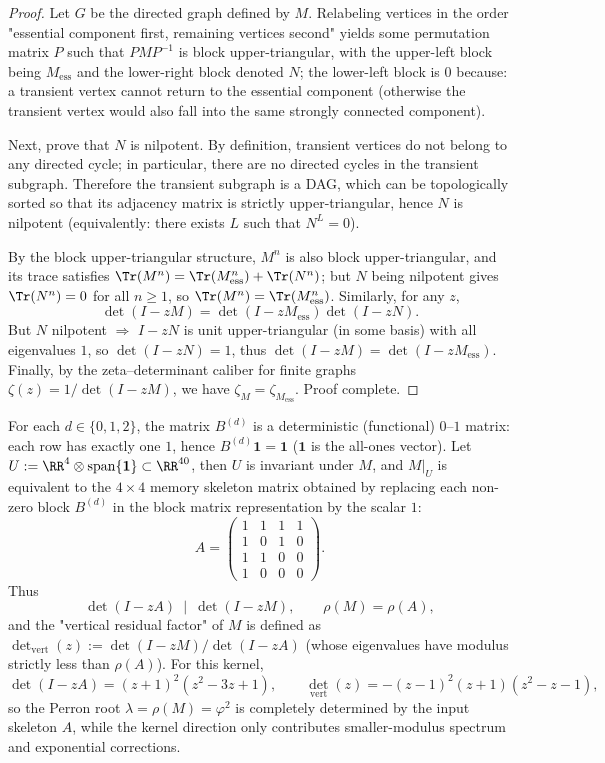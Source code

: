 \begin{proof}
Let $G$ be the directed graph defined by $M$. Relabeling vertices in the order "essential component first, remaining vertices second" yields some permutation matrix $P$ such that $PMP^{-1}$ is block upper-triangular, with the upper-left block being $M_{\mathrm{ess}}$ and the lower-right block denoted $N$; the lower-left block is $0$ because: a transient vertex cannot return to the essential component (otherwise the transient vertex would also fall into the same strongly connected component).

Next, prove that $N$ is nilpotent. By definition, transient vertices do not belong to any directed cycle; in particular, there are no directed cycles in the transient subgraph. Therefore the transient subgraph is a DAG, which can be topologically sorted so that its adjacency matrix is strictly upper-triangular, hence $N$ is nilpotent (equivalently: there exists $L$ such that $N^L=0$).

By the block upper-triangular structure, $M^n$ is also block upper-triangular, and its trace satisfies
\(
\Tr(M^n)=\Tr(M_{\mathrm{ess}}^n)+\Tr(N^n)
\); but $N$ being nilpotent gives $\Tr(N^n)=0$ for all $n\ge 1$, so $\Tr(M^n)=\Tr(M_{\mathrm{ess}}^n)$.
Similarly, for any $z$,
\[
\det(I-zM)=\det(I-zM_{\mathrm{ess}})\det(I-zN).
\]
But $N$ nilpotent $\Rightarrow$ $I-zN$ is unit upper-triangular (in some basis) with all eigenvalues $1$, so $\det(I-zN)=1$, thus $\det(I-zM)=\det(I-zM_{\mathrm{ess}})$.
Finally, by the zeta--determinant caliber for finite graphs $\zeta(z)=1/\det(I-zM)$, we have $\zeta_M=\zeta_{M_{\mathrm{ess}}}$. Proof complete.
\end{proof}

\begin{proposition}\label{prop:real-input-40-skeleton-factor}
For each $d\in\{0,1,2\}$, the matrix $B^{(d)}$ is a deterministic (functional) $0$--$1$ matrix: each row has exactly one $1$, hence $B^{(d)}\mathbf{1}=\mathbf{1}$ ($\mathbf{1}$ is the all-ones vector).
Let
\(
U:=\RR^{4}\otimes \mathrm{span}\{\mathbf{1}\}\subset\RR^{40}
\),
then $U$ is invariant under $M$, and $M|_U$ is equivalent to the $4\times 4$ memory skeleton matrix obtained by replacing each non-zero block $B^{(d)}$ in the block matrix representation by the scalar $1$:
\[
A=\begin{pmatrix}
1&1&1&1\\
1&0&1&0\\
1&1&0&0\\
1&0&0&0
\end{pmatrix}.
\]
Thus
\[
\det(I-zA)\ \mid\ \det(I-zM),
\qquad
\rho(M)=\rho(A),
\]
and the "vertical residual factor" of $M$ is defined as
\(
\det_{\mathrm{vert}}(z):=\det(I-zM)/\det(I-zA)
\)
(whose eigenvalues have modulus strictly less than $\rho(A)$).
For this kernel,
\[
\det(I-zA)=(z+1)^2(z^2-3z+1),
\qquad
\det_{\mathrm{vert}}(z)=-(z-1)^2(z+1)(z^2-z-1),
\]
so the Perron root $\lambda=\rho(M)=\varphi^2$ is completely determined by the input skeleton $A$, while the kernel direction only contributes smaller-modulus spectrum and exponential corrections.
\end{proposition}


